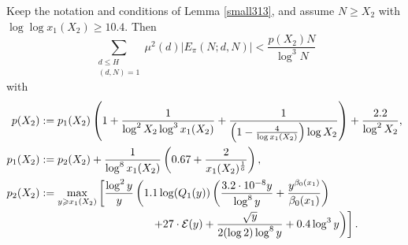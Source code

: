 \documentclass[12pt]{amsart}
\begin{document}
\begin{lemma}\label{small533}
    Keep the notation and conditions of Lemma \ref{small313}, and assume $N \ge X_2$ with $\log \log x_1(X_2) \ge 10.4$. Then
    \begin{equation*}
        \sum_{\substack{d\le H\\(d,N)=1}}\mu^2(d)|E_{\pi}(N;d,N)|<\frac{p(X_2)N}{\log^3N}
    \end{equation*}
    with
    \begin{align}\label{peq}
        p(X_2)&:=p_1(X_2)\left(1+\frac{1}{\log^2 X_2\log^3 x_1(X_2)}+\frac{1}{\left(1-\frac{4}{\log x_1(X_2)}\right)\log X_2}\right)+\frac{2.2}{\log^2 X_2}\notag,\\
        p_1(X_2)&:=p_2(X_2)+\frac{1}{\log^{8}x_1(X_2)}\left(0.67+\frac{2}{x_1(X_2)^{\frac{1}{6}}}\right)\notag,\\
        p_2(X_2)&:=\max_{y\ge x_1(X_2)}\left[\frac{\log^2 y}{y}\left(1.1\log(Q_1(y))\left(\frac{3.2\cdot 10^{-8}y}{\log^{8}y}+\frac{y^{\beta_0(x_1)}}{\beta_0(x_1)}\right)\right.\right.\\
        &\qquad\qquad\qquad\qquad\qquad\left.\left.+27\cdot\mathcal{E}(y)+\frac{\sqrt{y}}{2(\log 2)\log^{8}y}+0.4\log^3y\right)\right].\notag
    \end{align}
\end{lemma}
\end{document}
